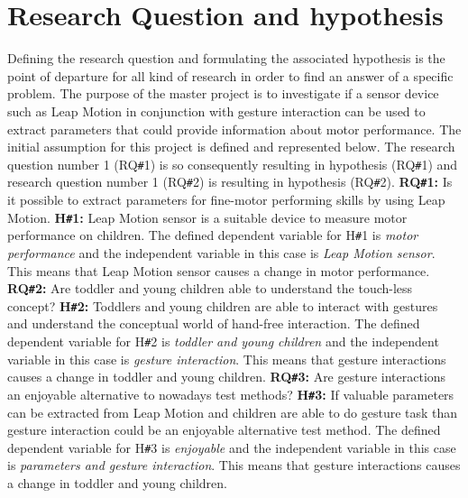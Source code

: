\section{Research Question and hypothesis}
\label{sec:researchquestion}

Defining the research question and formulating the associated hypothesis is the point of departure for all kind of research in order to find an answer of a specific problem.
\newline
The purpose of the master project is to investigate if a sensor device such as Leap Motion in conjunction with gesture interaction can be used to extract parameters that could provide information about motor performance. The initial assumption for this project is defined and represented below. The research question number 1 (RQ\texttt{\#}1) is so consequently resulting in hypothesis (RQ\texttt{\#}1) and research question number 1 (RQ\texttt{\#}2) is resulting in hypothesis (RQ\texttt{\#}2).
\newline
\newline
\textbf{RQ\texttt{\#}1:} Is it possible to extract parameters for fine-motor performing skills by using Leap Motion.
\newline
\textbf{H\texttt{\#}1:} Leap Motion sensor is a suitable device to measure motor performance on children.
\vspace{3mm} %
\hfill \break
The defined dependent variable for H\texttt{\#}1 is \textit{motor performance} and the independent variable in this case is \textit{Leap Motion sensor}. This means that Leap Motion sensor causes a change in motor performance.
\newline
\textbf{RQ\texttt{\#}2:} Are toddler and young children able to understand the touch-less concept?
\newline
\textbf{H\texttt{\#}2:} Toddlers and young children are able to interact with gestures and understand the conceptual world of hand-free interaction.
\vspace{3mm} %
\hfill \break
The defined dependent variable for H\texttt{\#}2 is \textit{toddler and young children} and the independent variable in this case is \textit{gesture interaction}. This means that gesture interactions causes a change in toddler and young children.
\vspace{5mm} %
\hfill \break
\textbf{RQ\texttt{\#}3:} Are gesture interactions an enjoyable alternative to nowadays test methods?
\newline
\textbf{H\texttt{\#}3:} If valuable parameters can be extracted from Leap Motion and children are able to do gesture task than gesture interaction could be an enjoyable alternative test method.
\vspace{3mm} %
\hfill \break
The defined dependent variable for H\texttt{\#}3 is \textit{enjoyable} and the independent variable in this case is \textit{parameters and gesture interaction}. This means that gesture interactions causes a change in toddler and young children.


